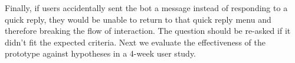 Finally, if users accidentally sent the bot a message instead of responding to a quick reply, they would be unable to return to that quick reply menu and therefore breaking the flow of interaction. The question should be re-asked if it didn't fit the expected criteria. Next we evaluate the effectiveness of the prototype against hypotheses in a 4-week user study.

\newpage
